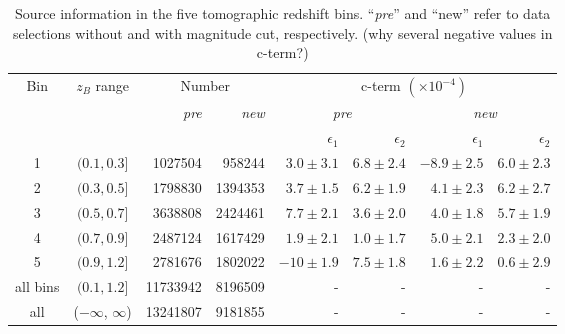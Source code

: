 \documentclass[fleqn,usenatbib]{mnras}
\newcommand{\R}{\color{red}}
\begin{document}
\begin{table}
\caption{Source information in the five tomographic redshift bins. ``{\it pre}'' and ``{new}'' refer to data selections without and with magnitude cut, respectively. ({\R why several negative values in c-term?})}
\label{table:si}
\begin{tabularx}{\textwidth}{c|c|rr|rrrr}
\hline
\hline
Bin & $z_B$ range &  \multicolumn{2}{c|}{Number} & \multicolumn{4}{c}{c-term $(\times 10^{-4})$} \\
 & & {\it pre} & {\it new} & \multicolumn{2}{c}{\it pre} & \multicolumn{2}{c}{\it new} \\
 & & & & $\epsilon_1$ & $\epsilon_2$ & $\epsilon_1$ & $\epsilon_2$ \\
\hline
1 & $(0.1, 0.3]$ & \num{1027504} & \num{958244} & $3.0\pm 3.1$ & $6.8\pm 2.4$ & $-8.9\pm 2.5$ & $6.0\pm 2.3$ \\
2 & $(0.3, 0.5]$ & \num{1798830} & \num{1394353} & $3.7\pm 1.5$ & $6.2\pm 1.9$ & $4.1\pm 2.3$ & $6.2\pm 2.7$ \\
3 & $(0.5, 0.7]$ & \num{3638808} & \num{2424461} & $7.7\pm 2.1$ & $3.6\pm 2.0$ & $4.0\pm 1.8$ & $5.7\pm 1.9$ \\
4 & $(0.7, 0.9]$ & \num{2487124} & \num{1617429} & $1.9\pm 2.1$ & $1.0\pm 1.7$ & $5.0\pm 2.1$ & $2.3\pm 2.0$ \\
5 & $(0.9, 1.2]$ & \num{2781676} & \num{1802022} & $-10\pm 1.9$ & $7.5\pm 1.8$ & $1.6\pm 2.2$ & $0.6\pm 2.9$ \\
\hline
all bins & $(0.1, 1.2]$ & \num{11733942} & \num{8196509} & - & - & - & - \\
all & ($-\infty$, $\infty$) & \num{13241807} & \num{9181855} & - & - & - & - \\

\hline
\end{tabularx}
\end{table}
\end{document}
